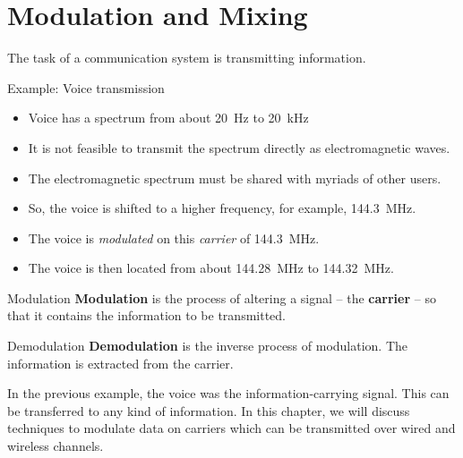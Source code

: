 %
%
%

\chapter{Modulation and Mixing}

\begin{refsection}
	
The task of a communication system is transmitting information.

Example: Voice transmission
\begin{itemize}
	\item Voice has a spectrum from about \SI{20}{Hz} to \SI{20}{kHz}
	\item It is not feasible to transmit the spectrum directly as electromagnetic waves.
	\item The electromagnetic spectrum must be shared with myriads of other users.
	\item So, the voice is shifted to a higher frequency, for example, \SI{144.3}{MHz}.
	\item The voice is \emph{modulated} on this \emph{carrier} of \SI{144.3}{MHz}.
	\item The voice is then located from about \SI{144.28}{MHz} to \SI{144.32}{MHz}.
\end{itemize}

\begin{definition}{Modulation}
	 \textbf{Modulation} is the process of altering a signal -- the  \textbf{carrier} -- so that it contains the information to be transmitted.
\end{definition}

\begin{definition}{Demodulation}
	 \textbf{Demodulation} is the inverse process of modulation. The information is extracted from the carrier.
\end{definition}

In the previous example, the voice was the information-carrying signal. This can be transferred to any kind of information. In this chapter, we will discuss techniques to modulate data on carriers which can be transmitted over wired and wireless channels.


\end{refsection}
